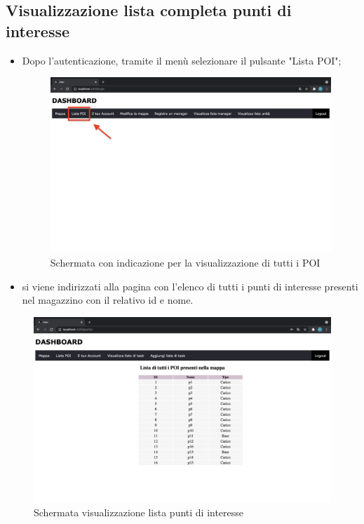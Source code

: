 \subsection{Visualizzazione lista completa punti di interesse}
\begin{itemize}
    \item Dopo l'autenticazione, tramite il menù selezionare il pulsante "Lista POI";
    \begin{figure}[H]
        \centering
        \includegraphics[scale=0.12]{res/images/dashboard2.png}
        \caption{Schermata con indicazione per la visualizzazione di tutti i POI}
    \end{figure}
    \item si viene indirizzati alla pagina con l'elenco di tutti i punti di interesse presenti nel magazzino con il relativo id e nome.

\end{itemize}

\begin{figure}[H]
    \centering
    \includegraphics[scale=0.12]{res/images/listpoi_user.png}
    \caption{Schermata visualizzazione lista punti di interesse}
\end{figure}

